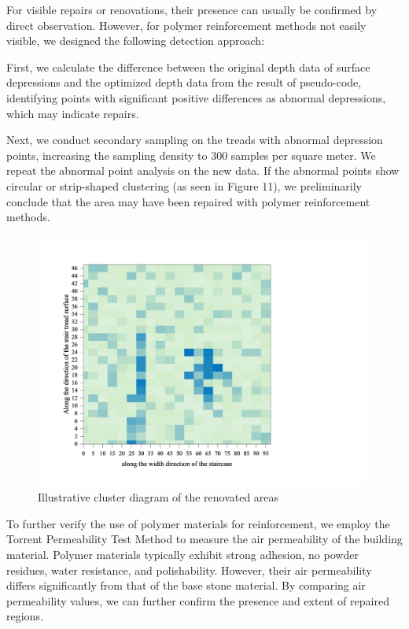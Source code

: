 \documentclass{mcmthesis}
\begin{document}
For visible repairs or renovations, their presence can usually be confirmed by direct observation. However, for polymer reinforcement methods not easily visible, we designed the following detection approach:

First, we calculate the difference between the original depth data of surface depressions and the optimized depth data from the result of pseudo-code, identifying points with significant positive differences as abnormal depressions, which may indicate repairs.

Next, we conduct secondary sampling on the treads with abnormal depression points, increasing the sampling density to 300 samples per square meter. We repeat the abnormal point analysis on the new data. If the abnormal points show circular or strip-shaped clustering (as seen in Figure 11), we preliminarily conclude that the area may have been repaired with polymer reinforcement methods.
\begin{figure}[h]  %
  \small
  \centering  %
  \includegraphics[width=11cm]{13-Illustrative cluster diagram of the renovated areas.png}
  \caption{Illustrative cluster diagram of the renovated areas} \label{fig:2}  %
  \end{figure}  %



To further verify the use of polymer materials for reinforcement, we employ the Torrent Permeability Test Method to measure the air permeability of the building material\cite{sena2015non}. Polymer materials typically exhibit strong adhesion, no powder residues, water resistance, and polishability. However, their air permeability differs significantly from that of the base stone material. By comparing air permeability values, we can further confirm the presence and extent of repaired regions.
\end{document}
